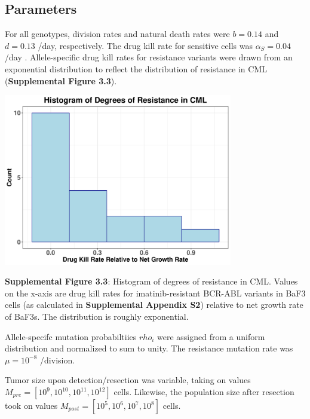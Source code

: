 \documentclass{article}
\begin{document}
\subsection{Parameters}
For all genotypes, division rates and natural death rates were $b = 0.14$ and $d = 0.13$ /day, respectively.  The drug kill rate for sensitive cells was $\alpha_S=0.04$ /day \cite{3}.  Allele-specific drug kill rates for resistance variants were drawn from an exponential distribution to reflect the distribution of resistance in CML (\textbf{Supplemental Figure 3.3}).

\begin{center}
\includegraphics[width=0.75\textwidth]{CMLResistanceHistogram}

\textbf{Supplemental Figure 3.3}: Histogram of degrees of resistance in CML.  Values on the x-axis are drug kill rates for imatinib-resistant BCR-ABL variants in BaF3 cells (as calculated in \textbf{Supplemental Appendix S2}) relative to net growth rate of BaF3s.  The distribution is roughly exponential.
\end{center}

Allele-specifc mutation probabiltiies $rho_i$ were assigned from a uniform distribution and normalized to sum to unity.  The resistance mutation rate was $\mu=10^{-8}$ /division.

Tumor size upon detection/resection was variable, taking on values $M_{pre} = [10^9, 10^{10}, 10^{11}, 10^{12}]$ cells.  Likewise, the population size after resection took on values $M_{post} = [10^5, 10^6, 10^7, 10^8]$ cells.
\end{document}
